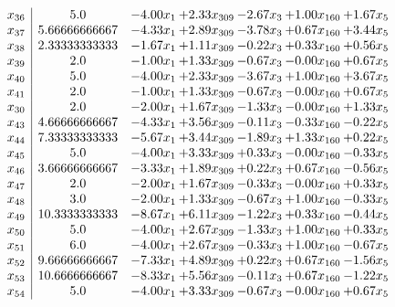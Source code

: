 \documentclass[8pt]{article}
\begin{document}
\[\begin{array}{c| c c@{\hskip 2pt} c@{\hskip 2pt} c@{\hskip 2pt} c@{\hskip 2pt} c@{\hskip 2pt} }
 x_{36}   &  5.0 & -4.00 x_{1} & +  2.33 x_{309} & -2.67 x_{3} & +  1.00 x_{160} & +  1.67 x_{5}\\
 x_{37}   &  5.66666666667 & -4.33 x_{1} & +  2.89 x_{309} & -3.78 x_{3} & +  0.67 x_{160} & +  3.44 x_{5}\\
 x_{38}   &  2.33333333333 & -1.67 x_{1} & +  1.11 x_{309} & -0.22 x_{3} & +  0.33 x_{160} & +  0.56 x_{5}\\
 x_{39}   &  2.0 & -1.00 x_{1} & +  1.33 x_{309} & -0.67 x_{3} & -0.00 x_{160} & +  0.67 x_{5}\\
 x_{40}   &  5.0 & -4.00 x_{1} & +  2.33 x_{309} & -3.67 x_{3} & +  1.00 x_{160} & +  3.67 x_{5}\\
 x_{41}   &  2.0 & -1.00 x_{1} & +  1.33 x_{309} & -0.67 x_{3} & -0.00 x_{160} & +  0.67 x_{5}\\
 x_{30}   &  2.0 & -2.00 x_{1} & +  1.67 x_{309} & -1.33 x_{3} & -0.00 x_{160} & +  1.33 x_{5}\\
 x_{43}   &  4.66666666667 & -4.33 x_{1} & +  3.56 x_{309} & -0.11 x_{3} & -0.33 x_{160} & -0.22 x_{5}\\
 x_{44}   &  7.33333333333 & -5.67 x_{1} & +  3.44 x_{309} & -1.89 x_{3} & +  1.33 x_{160} & +  0.22 x_{5}\\
 x_{45}   &  5.0 & -4.00 x_{1} & +  3.33 x_{309} & +  0.33 x_{3} & -0.00 x_{160} & -0.33 x_{5}\\
 x_{46}   &  3.66666666667 & -3.33 x_{1} & +  1.89 x_{309} & +  0.22 x_{3} & +  0.67 x_{160} & -0.56 x_{5}\\
 x_{47}   &  2.0 & -2.00 x_{1} & +  1.67 x_{309} & -0.33 x_{3} & -0.00 x_{160} & +  0.33 x_{5}\\
 x_{48}   &  3.0 & -2.00 x_{1} & +  1.33 x_{309} & -0.67 x_{3} & +  1.00 x_{160} & -0.33 x_{5}\\
 x_{49}   &  10.3333333333 & -8.67 x_{1} & +  6.11 x_{309} & -1.22 x_{3} & +  0.33 x_{160} & -0.44 x_{5}\\
 x_{50}   &  5.0 & -4.00 x_{1} & +  2.67 x_{309} & -1.33 x_{3} & +  1.00 x_{160} & +  0.33 x_{5}\\
 x_{51}   &  6.0 & -4.00 x_{1} & +  2.67 x_{309} & -0.33 x_{3} & +  1.00 x_{160} & -0.67 x_{5}\\
 x_{52}   &  9.66666666667 & -7.33 x_{1} & +  4.89 x_{309} & +  0.22 x_{3} & +  0.67 x_{160} & -1.56 x_{5}\\
 x_{53}   &  10.6666666667 & -8.33 x_{1} & +  5.56 x_{309} & -0.11 x_{3} & +  0.67 x_{160} & -1.22 x_{5}\\
 x_{54}   &  5.0 & -4.00 x_{1} & +  3.33 x_{309} & -0.67 x_{3} & -0.00 x_{160} & +  0.67 x_{5}\\

\end{array}\]
\end{document}
